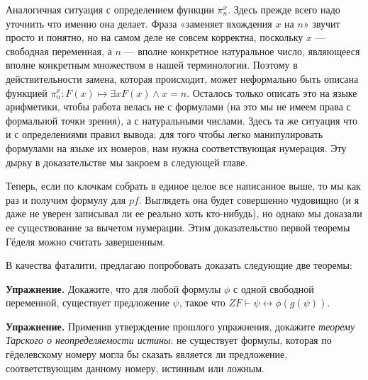 Аналогичная ситуация с определением функции $\pi^x_n$. Здесь прежде всего надо уточнить что именно она делает. Фраза «заменяет вхождения $x$ на $n$» звучит просто и понятно, но на самом деле не совсем корректна, поскольку $x$ — свободная переменная, а $n$ — вполне конкретное натуральное число, являющееся вполне конкретным множеством в нашей терминологии. Поэтому в действительности замена, которая происходит, может неформально быть описана функцией $\pi^x_n: F(x)\mapsto \exists x F(x)\wedge x=n$. Осталось только описать это на языке арифметики, чтобы работа велась не с формулами (на это мы не имеем права с формальной точки зрения), а с натуральными числами. Здесь та же ситуация что и с определениями правил вывода: для того чтобы легко манипулировать формулами на языке их номеров, нам нужна соответствующая нумерация. Эту дырку в доказательстве мы закроем в следующей главе.

Теперь, если по клочкам собрать в единое целое все написанное выше, то мы как раз и получим формулу для $pf$. Выглядеть она будет совершенно чудовищно (и я даже не уверен записывал ли ее реально хоть кто-нибудь), но однако мы доказали ее существование за вычетом нумерации. Этим доказательство первой теоремы Гёделя можно считать завершенным.

В качества фаталити, предлагаю попробовать доказать следующие две теоремы:

{\bfseries Упражнение.} Докажите, что для любой формулы $\phi$ с одной свободной переменной, существует предложение $\psi$, такое что $ZF\vdash \psi \leftrightarrow \phi(g(\psi))$.

{\bfseries Упражнение.} Применив утверждение прошлого упражнения, докажите {\slshape теорему Тарского о неопределяемости истины}: не существует формулы, которая по гёделевскому номеру могла бы сказать является ли  предложение, соответствующим данному номеру, истинным или ложным.
